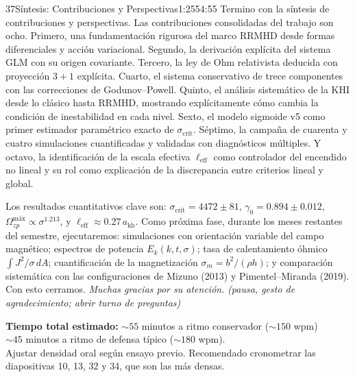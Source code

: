 \documentclass[11pt,a4paper]{article}
\newcommand{\escena}[1]{\textit{\textcolor{neutral!70!white}{(#1)}}}
\begin{document}
\begin{bryorador}{37}{Síntesis: Contribuciones y Perspectivas}{1:25}{54:55}
Termino con la síntesis de contribuciones y perspectivas. Las contribuciones
consolidadas del trabajo son ocho. Primero, una fundamentación rigurosa del
marco RRMHD desde formas diferenciales y acción variacional. Segundo, la
derivación explícita del sistema GLM con su origen covariante. Tercero, la
ley de Ohm relativista deducida con proyección $3+1$ explícita. Cuarto, el
sistema conservativo de trece componentes con las correcciones de
Godunov--Powell. Quinto, el análisis sistemático de la KHI desde lo clásico
hasta RRMHD, mostrando explícitamente cómo cambia la condición de
inestabilidad en cada nivel. Sexto, el modelo sigmoide v5 como primer
estimador paramétrico exacto de $\sigma_\text{crit}$. Séptimo, la campaña de
cuarenta y cuatro simulaciones cuantificadas y validadas con diagnósticos
múltiples. Y octavo, la identificación de la escala efectiva
$\ell_\text{eff}$ como controlador del encendido no lineal y su rol como
explicación de la discrepancia entre criterios lineal y global.

Los resultados cuantitativos clave son: $\sigma_\text{crit}=4472\pm 81$,
$\gamma_0=0.894\pm 0.012$, $\Omega^\text{máx}_{zp}\propto\sigma^{1.213}$, y
$\ell_\text{eff}\approx 0.27\,a_\text{kh}$. Como próxima fase, durante los
meses restantes del semestre, ejecutaremos: simulaciones con orientación
variable del campo magnético; espectros de potencia $E_k(k,t,\sigma)$; tasa
de calentamiento óhmico $\int J^2/\sigma\,dA$; cuantificación de la
magnetización $\sigma_m=b^2/(\rho h)$; y comparación sistemática con las
configuraciones de Mizuno (2013) y Pimentel--Miranda (2019). Con esto
cerramos. \emph{Muchas gracias por su atención.} \escena{pausa, gesto de
agradecimiento; abrir turno de preguntas}
\end{bryorador}

\vspace{1em}
\begin{center}
\begin{tcolorbox}[colback=tagbg, colframe=neutral!50, width=0.9\linewidth,
                  arc=2pt, boxrule=0.5pt]
\small\centering
\textbf{Tiempo total estimado:} $\sim 55$ minutos a ritmo conservador
($\sim 150$ wpm) \\
$\sim 45$ minutos a ritmo de defensa típico ($\sim 180$ wpm). \\[0.4em]
Ajustar densidad oral según ensayo previo. Recomendado cronometrar las
diapositivas 10, 13, 32 y 34, que son las más densas.
\end{tcolorbox}
\end{center}
\end{document}
